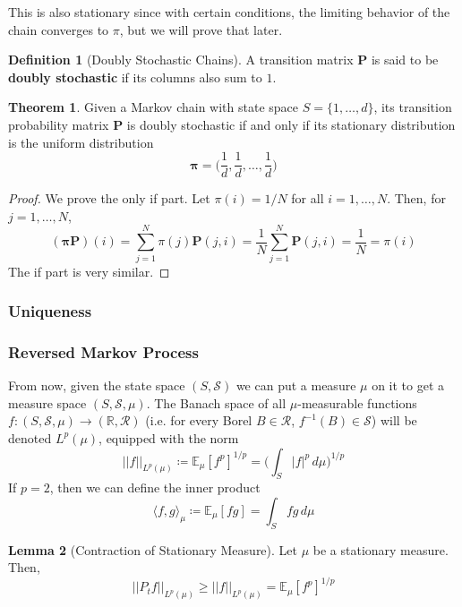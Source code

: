 \documentclass{article}
\theoremstyle{definition}
\newtheorem{theorem}{Theorem}[section]
\newtheorem{lemma}[theorem]{Lemma}
\theoremstyle{remark}
\theoremstyle{definition}
\newtheorem{definition}{Definition}[section]
\begin{document}
This is also stationary since with certain conditions, the limiting behavior of the chain converges to $\pi$, but we will prove that later. 

\begin{definition}[Doubly Stochastic Chains]
A transition matrix $\mathbf{P}$ is said to be \textbf{doubly stochastic} if its columns also sum to $1$. 
\end{definition}

\begin{theorem}
Given a Markov chain with state space $S = \{1, \ldots, d\}$, its transition probability matrix $\mathbf{P}$ is doubly stochastic if and only if its stationary distribution is the uniform distribution 
\[\boldsymbol{\pi} = \bigg( \frac{1}{d}, \frac{1}{d}, \ldots, \frac{1}{d} \bigg)\]
\end{theorem}
\begin{proof}
We prove the only if part. Let $\pi(i) = 1/N$ for all $i = 1, \ldots, N$. Then, for $j = 1, \ldots, N$, 
\[(\boldsymbol{\pi} \mathbf{P}) (i) = \sum_{j=1}^N \pi(j) \mathbf{P}(j, i) = \frac{1}{N} \sum_{j=1}^N \mathbf{P}(j, i) = \frac{1}{N} = \pi(i) \]
The if part is very similar. 
\end{proof}



\subsubsection{Uniqueness}

\subsubsection{Reversed Markov Process}

From now, given the state space $(S, \mathcal{S})$ we can put a measure $\mu$ on it to get a measure space $(S, \mathcal{S}, \mu)$. The Banach space of all $\mu$-measurable functions $f: (S, \mathcal{S}, \mu) \rightarrow (\mathbb{R}, \mathcal{R})$ (i.e. for every Borel $B \in \mathcal{R}$, $f^{-1}(B) \in \mathcal{S}$) will be denoted $L^p (\mu)$, equipped with the norm 
\[||f||_{L^p(\mu)} \coloneqq \mathbb{E}_\mu [f^p]^{1/p} = \bigg( \int_S |f|^p \,d\mu \bigg)^{1/p}\]
If $p = 2$, then we can define the inner product 
\[\langle f, g \rangle_\mu \coloneqq \mathbb{E}_\mu [f g] = \int_S f g \, d\mu\]

\begin{lemma}[Contraction of Stationary Measure]
Let $\mu$ be a stationary measure. Then, 
\[||P_t f||_{L^p(\mu)} \geq ||f||_{L^p (\mu)} = \mathbb{E}_\mu [f^p]^{1/p}\]
\end{lemma}
\end{document}
